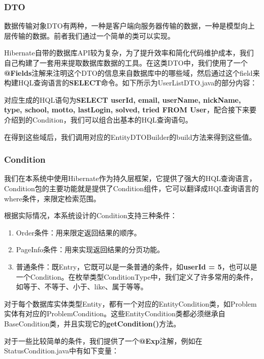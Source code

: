 \subsubsection{DTO}

数据传输对象DTO有两种，一种是客户端向服务器传输的数据，一种是模型向上层传输的数据。前者我们通过一个简单的类可以实现。

Hibernate自带的数据库API较为复杂，为了提升效率和简化代码维护成本，我们自己构建了一套用来提取数据库数据的工具。在这类DTO中，我们使用了一个\textbf{@Fields}注解来注明这个DTO的信息来自数据库中的哪些域，然后通过这个field来构建HQL查询语言的\textbf{SELECT}命令。如下所示为UserListDTO.java的部分内容：



对应生成的HQL语句为\textbf{SELECT userId, email, userName, nickName, type, school, motto, lastLogin, solved, tried FROM User}，配合接下来要介绍到的Condition，我们可以组合出基本的HQL查询语句。

在得到这些域后，我们调用对应的EntityDTOBuilder的build方法来得到这些值。

\subsubsection{Condition}

我们在本系统中使用Hibernate作为持久层框架，它提供了强大的HQL查询语言，Condition包的主要功能就是提供了Condition组件，它可以翻译成HQL查询语言的where条件，来限定检索范围。

根据实际情况，本系统设计的Condition支持三种条件：
\begin{enumerate}
	\item Order条件：用来限定返回结果的顺序。
	\item PageInfo条件：用来实现返回结果的分页功能。
	\item 普通条件：既Entry，它既可以是一条普通的条件，如\textbf{userId = 5}，也可以是一个Condition。在枚举类型ConditionType中，我们定义了许多常用的条件，如等于、不等于、小于、like、属于等等。
\end{enumerate}

对于每个数据库实体类型Entity，都有一个对应的EntityCondition类，如Problem实体有对应的ProblemCondition。这些EntityCondition类都必须继承自BaseCondition类，并且实现它的\textbf{getCondition()}方法。

对于一些比较简单的条件，我们提供了一个\textbf{@Exp}注解，例如在StatusCondition.java中有如下变量：

